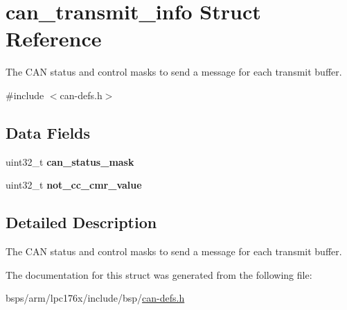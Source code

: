 \hypertarget{structcan__transmit__info}{}\section{can\+\_\+transmit\+\_\+info Struct Reference}
\label{structcan__transmit__info}


The C\+AN status and control masks to send a message for each transmit buffer.  




{\ttfamily \#include $<$can-\/defs.\+h$>$}

\subsection*{Data Fields}
\begin{DoxyCompactItemize}
\item 
\mbox{\label{structcan__transmit__info_a663149280f8d673b5013a56b410c23fb}} 
uint32\+\_\+t {\bfseries can\+\_\+status\+\_\+mask}
\item 
\mbox{\label{structcan__transmit__info_a4201e59545d709fabc48f0b36408a901}} 
uint32\+\_\+t {\bfseries not\+\_\+cc\+\_\+cmr\+\_\+value}
\end{DoxyCompactItemize}


\subsection{Detailed Description}
The C\+AN status and control masks to send a message for each transmit buffer. 

The documentation for this struct was generated from the following file\+:\begin{DoxyCompactItemize}
\item 
bsps/arm/lpc176x/include/bsp/\mbox{\hyperlink{can-defs_8h}{can-\/defs.\+h}}\end{DoxyCompactItemize}
